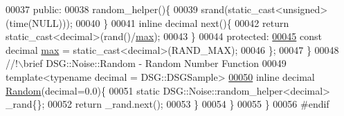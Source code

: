 \begin{DoxyCode}
00037             \textcolor{keyword}{public}:
00038                 random\_helper()\{
00039                     srand(static\_cast<unsigned>(time(NULL)));
00040                 \}
00041                 \textcolor{keyword}{inline} decimal next()\{
00042                     \textcolor{keywordflow}{return} \textcolor{keyword}{static\_cast<}decimal\textcolor{keyword}{>}(rand()/\hyperlink{_random_8h_adf0c2e3aed2e917753f8cca4522e205e}{max});
00043                 \}
00044             \textcolor{keyword}{protected}:
\hypertarget{_random_8h_source_l00045}{}\hyperlink{_random_8h_adf0c2e3aed2e917753f8cca4522e205e}{00045}                 \textcolor{keyword}{const} decimal \hyperlink{_random_8h_adf0c2e3aed2e917753f8cca4522e205e}{max} = \textcolor{keyword}{static\_cast<}decimal\textcolor{keyword}{>}(RAND\_MAX);
00046             \};
00047         \}\textcolor{comment}{}
00048 \textcolor{comment}{        //!\(\backslash\)brief DSG::Noise::Random - Random Number Function}
00049 \textcolor{comment}{}        \textcolor{keyword}{template}<\textcolor{keyword}{typename} decimal = DSG::DSGSample>
\hypertarget{_random_8h_source_l00050}{}\hyperlink{namespace_d_s_g_1_1_noise_af210d83913fada9e9474410caff25bc1}{00050}         \textcolor{keyword}{inline} decimal \hyperlink{namespace_d_s_g_1_1_noise_af210d83913fada9e9474410caff25bc1}{Random}(decimal=0.0)\{
00051             \textcolor{keyword}{static} DSG::Noise::random\_helper<decimal> \_rand\{\};
00052             \textcolor{keywordflow}{return} \_rand.next();
00053         \}
00054     \}
00055 \}
00056 \textcolor{preprocessor}{#endif}
\end{DoxyCode}
